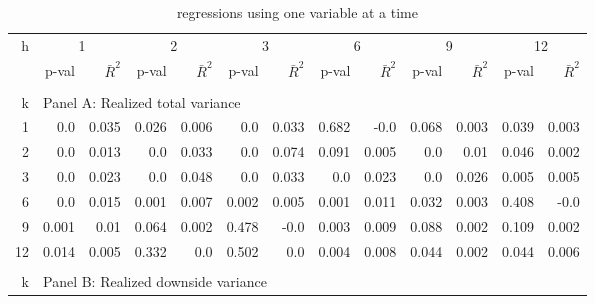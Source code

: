 \documentclass{article}
\begin{document}
\begin{table}[h]
\begin{center}
\caption{regressions using one variable at a time}
\label{table:regression1}

\begin{tabular}{@{\extracolsep{6pt}}rrrrrrrrrrrrr@{}}

\hline

h & \multicolumn{2}{c}{1} & \multicolumn{2}{c}{2} & \multicolumn{2}{c}{3} & \multicolumn{2}{c}{6} & \multicolumn{2}{c}{9} & \multicolumn{2}{c}{12} \\[6pt]

\cline{2-3} \cline{4-5} \cline{6-7} \cline{8-9} \cline{10-11} \cline{12-13}

 & p-val & $\bar{R}^{2}$ & p-val & $\bar{R}^{2}$ &  p-val & $\bar{R}^{2}$ &  
 p-val & $\bar{R}^{2}$ &  p-val & $\bar{R}^{2}$ &  p-val & $\bar{R}^{2}$ \\[6pt]
 
\hline\\[0.000000001pt]

k & \multicolumn{12}{l}{Panel A: Realized total variance} \\[7pt]

\hline

1 & 0.0 & 0.035 & 0.026 & 0.006 & 0.0 & 0.033 & 0.682 & -0.0 & 0.068 & 0.003 & 0.039 & 0.003 \\[6pt]
2 & 0.0 & 0.013 & 0.0 & 0.033 & 0.0 & 0.074 & 0.091 & 0.005 & 0.0 & 0.01 & 0.046 & 0.002 \\[6pt]
3 & 0.0 & 0.023 & 0.0 & 0.048 & 0.0 & 0.033 & 0.0 & 0.023 & 0.0 & 0.026 & 0.005 & 0.005 \\[6pt]
6 & 0.0 & 0.015 & 0.001 & 0.007 & 0.002 & 0.005 & 0.001 & 0.011 & 0.032 & 0.003 & 0.408 & -0.0 \\[6pt]
9 & 0.001 & 0.01 & 0.064 & 0.002 & 0.478 & -0.0 & 0.003 & 0.009 & 0.088 & 0.002 & 0.109 & 0.002 \\[6pt]
12 & 0.014 & 0.005 & 0.332 & 0.0 & 0.502 & 0.0 & 0.004 & 0.008 & 0.044 & 0.002 & 0.044 & 0.006 \\[6pt]
 
\hline\\[0.000000001pt]

k & \multicolumn{12}{l}{Panel B: Realized downside variance} \\[7pt]

\hline


\end{tabular}
\end{center}
\end{table}
\end{document}
